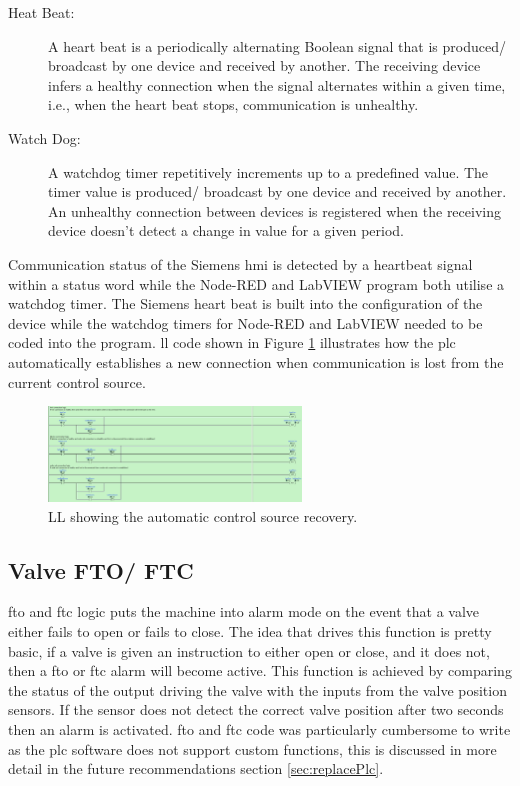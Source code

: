         \begin{description}
            \item[Heat Beat:] A heart beat is a periodically alternating Boolean signal that is produced/ broadcast by one device and received by another. The receiving device infers a healthy connection when the signal alternates within a given time, i.e., when the heart beat stops, communication is unhealthy.   
            \item[Watch Dog:] A watchdog timer repetitively increments up to a predefined value. The timer value is produced/ broadcast by one device and received by another. An unhealthy connection between devices is registered when the receiving device doesn't detect a change in value for a given period.
        \end{description}

        Communication status of the Siemens \acrshort{hmi} is detected by a heartbeat signal within a status word while the Node-RED and LabVIEW program both utilise a watchdog timer. The Siemens heart beat is built into the configuration of the device while the watchdog timers for Node-RED and LabVIEW needed to be coded into the program.
        \acrshort{ll} code shown in Figure \ref{fig:autoControlSourceRecovery} illustrates how the \acrshort{plc} automatically establishes a new connection when communication is lost from the current control source.  

        \begin{figure}[H]
            \centering
            \includegraphics[width = 0.6\textwidth]{2_images/autoControlSourceRecovery}
            \caption{LL showing the automatic control source recovery.}
            \label{fig:autoControlSourceRecovery}
        \end{figure}        

    \subsection{Valve FTO/ FTC} \label{sec:valveFtoFtc}
        \acrfull{fto} and \acrfull{ftc} logic puts the machine into alarm mode on the event that a valve either fails to open or fails to close. The idea that drives this function is pretty basic, if a valve is given an instruction to either open or close, and it does not, then a \acrshort{fto} or \acrshort{ftc} alarm will become active. This function is achieved by comparing the status of the output driving the valve with the inputs from the valve position sensors. If the sensor does not detect the correct valve position after two seconds then an alarm is activated. \acrshort{fto} and \acrshort{ftc} code was particularly cumbersome to write as the \acrshort{plc} software does not support custom functions, this is discussed in more detail in the future recommendations section \ref{sec:replacePlc}.

